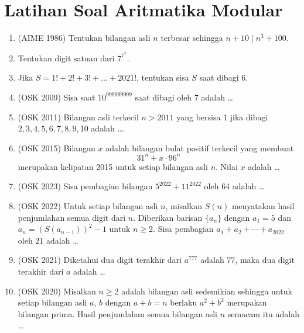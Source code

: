 \documentclass[12pt]{scrartcl}
\begin{document}


\section{Latihan Soal Aritmatika Modular}
\begin{enumerate}    
    \item (AIME 1986) Tentukan bilangan asli $n$ terbesar sehingga $n+10 \mid n^3+100$.
    
    \item Tentukan digit satuan dari $7^{7^7}$.
    
    \item Jika $S=1!+2!+3!+\dots+2021!$, tentukan sisa $S$ saat dibagi 6.
    
    \item (OSK 2009) Sisa saat $10^{999999999}$ saat dibagi oleh 7 adalah \dots
    
    \item (OSK 2011) Bilangan asli terkecil $n>2011$ yang bersisa 1 jika dibagi $2,3,4,5,6,7,8,9,10$ adalah \dots.

    \item (OSK 2015) Bilangan $x$ adalah bilangan bulat positif terkecil yang membuat
    \[31^n + x \cdot 96^n\]
    merupakan kelipatan 2015 untuk setiap bilangan asli $n$. Nilai $x$ adalah \ldots

    \item (OSK 2023) Sisa pembagian bilangan $5^{2022}+11^{2022}$ oleh $64$ adalah \ldots

    \item (OSK 2022) Untuk setiap bilangan asli $n$, misalkan $S(n)$ menyatakan hasil penjumlahan semua digit dari $n$. Diberikan barisan $\{a_n\}$ dengan $a_1 = 5$ dan $a_n = (S(a_{n-1}))^2 - 1$ untuk $n \geq 2$. Sisa pembagian $a_1 + a_2 + \cdots + a_{2022}$ oleh $21$ adalah \ldots
    
    \item (OSK 2021) Diketahui dua digit terakhir dari $a^{777}$ adalah $77$, maka dua digit terakhir dari $a$ adalah \ldots

    \item (OSK 2020) Misalkan $n \geq 2$ adalah bilangan asli sedemikian sehingga untuk setiap bilangan asli $a$, $b$ dengan $a + b = n$ berlaku $a^2 + b^2$ merupakan bilangan prima. Hasil penjumlahan semua bilangan asli $n$ semacam itu adalah \ldots


\end{enumerate}
\end{document}
